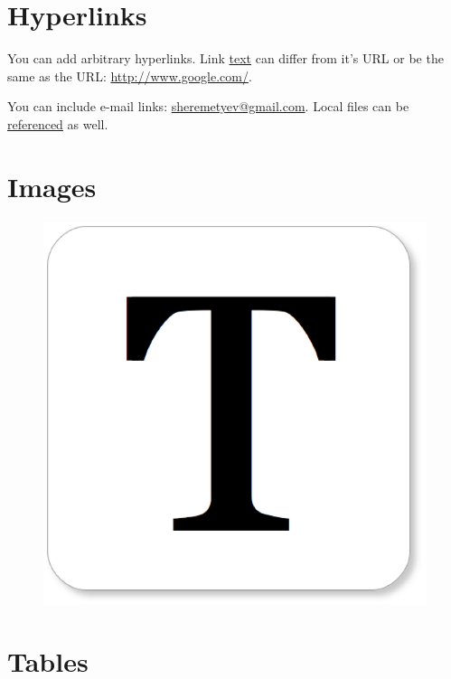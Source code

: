 \documentclass[10pt]{article}
\begin{document}
\section{Hyperlinks}

You can add arbitrary hyperlinks. Link \href{http://www.texts.io/}{text} can
differ from it's URL or be the same as the URL: \url{http://www.google.com/}.

You can include e-mail links:
\href{mailto:sheremetyev@gmail.com}{sheremetyev@gmail.com}. Local files can be
\href{run:basic.pdf}{referenced} as well.

\section{Images}

\begin{figure}[H]
\centering
\includegraphics{Texts_Logo.png}
\end{figure}

\section{Tables}
\end{document}
